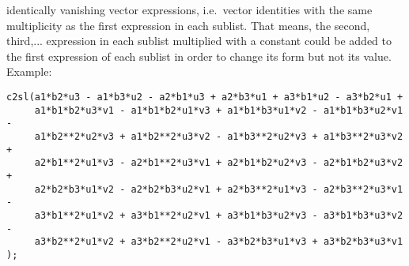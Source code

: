 \documentclass[12pt]{article}
\begin{document}
\begin{description}
  identically vanishing vector expressions, i.e.\ vector identities
  with the same multiplicity as the first expression in each
  sublist. That means, the second, third,... expression in each
  sublist multiplied with a constant could be added to the first
  expression of each sublist in order to change its form but not its
  value. Example: \begin{verbatim}
c2sl(a1*b2*u3 - a1*b3*u2 - a2*b1*u3 + a2*b3*u1 + a3*b1*u2 - a3*b2*u1 + 
     a1*b1*b2*u3*v1 - a1*b1*b2*u1*v3 + a1*b1*b3*u1*v2 - a1*b1*b3*u2*v1 - 
     a1*b2**2*u2*v3 + a1*b2**2*u3*v2 - a1*b3**2*u2*v3 + a1*b3**2*u3*v2 + 
     a2*b1**2*u1*v3 - a2*b1**2*u3*v1 + a2*b1*b2*u2*v3 - a2*b1*b2*u3*v2 + 
     a2*b2*b3*u1*v2 - a2*b2*b3*u2*v1 + a2*b3**2*u1*v3 - a2*b3**2*u3*v1 - 
     a3*b1**2*u1*v2 + a3*b1**2*u2*v1 + a3*b1*b3*u2*v3 - a3*b1*b3*u3*v2 - 
     a3*b2**2*u1*v2 + a3*b2**2*u2*v1 - a3*b2*b3*u1*v3 + a3*b2*b3*u3*v1 );


\end{verbatim}
\end{description}
\end{document}

